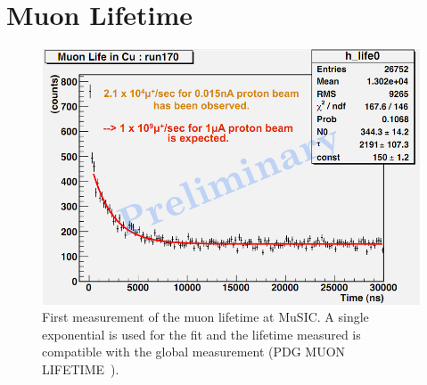 \chapter{Muon Lifetime} %
\label{sec:muon_lifetime}
\begin{figure}[hptb]
  \centering
    \includegraphics[width=.9\textwidth]{images/muon_decay_feb.png}
  \caption{First measurement of the muon lifetime at MuSIC. A single exponential is used for the fit and the lifetime measured is compatible with the global measurement (PDG MUON LIFETIME~\cite{pdg for muons}).  } 
  \label{fig:3_measurements_images_muon_decay_feb}
\end{figure}

